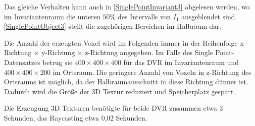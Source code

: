\documentclass[a4paper,fontsize=12pt,toc=bib,parskip=half,ngerman]{scrartcl}
\begin{document}
Das gleiche Verhalten kann auch in \cref{SinglePointInvariant3} abgelesen werden, wo im Invariantenraum die unteren 50\% des Intervalls von $I_1$ ausgeblendet sind. \cref{SinglePointObject3} stellt die zugeh\"origen Bereichen im Halbraum dar.

Die Anzahl der erzeugten Voxel wird im Folgenden immer in der Reihenfolge x-Richtung $\times$ y-Richtung $\times$ z-Richtung angegeben.
Im Falle des Single Point-Datensatzes betrug sie $400\times400\times400$ f\"ur das DVR im Invariantenraum und $400\times400\times200$ im Ortsraum. Die geringere Anzahl von Voxeln in z-Richtung des Ortsraums ist m\"oglich, da der Halbraumausschnitt in diese Richtung d\"unner ist. Dadurch wird die Gr\"o{\ss}e der 3D Textur reduziert und Speicherplatz gespart.

Die Erzeugung 3D Texturen ben\"otigte f\"ur beide DVR zusammen etwa 3 Sekunden, das Raycasting etwa 0,02 Sekunden.
\end{document}
